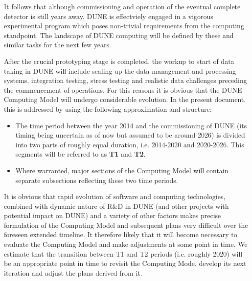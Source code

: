 It follows that although commissioning and operation of the eventual complete detector is still years away, DUNE is effectviely engaged
in a vigorous experimental program which poses non-trivial requirements from the computing standpoint. The landscape of DUNE
computing will be defined by these and similar tasks for the next few years.

After the crucial prototyping stage is completed, the workup to start of data taking in DUNE will include scaling up the data management and processing systems,
integration testing,  stress testing and  realistic data challenges preceding the commencement of operations. For this reasons it is obvious that the DUNE
Computing Model will undergo considerable evolution. In the present document, this is addressed  by using the following approximation and structure:

\begin{itemize}

\item The time period between the year 2014 and the commissioning of DUNE (its timing being uncertain as of now but assumed to be around 2026) is divided into two parts of roughly equal duration, i.e. 2014-2020 and 2020-2026. This segments will be referred to as \textbf{T1} and \textbf{T2}.


\item Where warranted, major sections of the Computing Model will contain separate subsections reflecting these two time periods.

\end{itemize}
 
It is obvious that rapid evolution of software and computing technologies, combined with dynamic nature of R\&D in DUNE (and other  projects with potential impact on DUNE) and a variety of other factors makes precise formulation of the Computing Model and subsequent plans very difficult over the foreseen extended timeline. It  therefore likely that it will become necessary to evaluate the Computing Model and make adjustments at some point in time. We estimate that the transition between T1 and T2 periods (i.e. roughly 2020) will be an appropriate point in time to revisit the Computing Mode, develop its next
iteration and adjust the plans derived from it.

